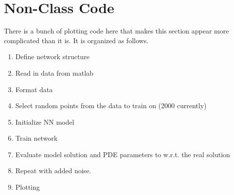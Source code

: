 \documentclass[10pt]{article}
\begin{document}
\section{Non-Class Code}
There is a bunch of plotting code here that makes this section appear more complicated than it is. It is organized as follows.
\begin{enumerate}
    \item Define network structure
    \item Read in data from matlab
    \item Format data
    \item Select random points from the data to train on (2000 currently)
    \item Initialize NN model
    \item Train network
    \item Evaluate model solution and PDE parameters to w.r.t. the real solution
    \item Repeat with added noise.
    \item Plotting
\end{enumerate}
	
\nocite{*}
{}

\end{document}
